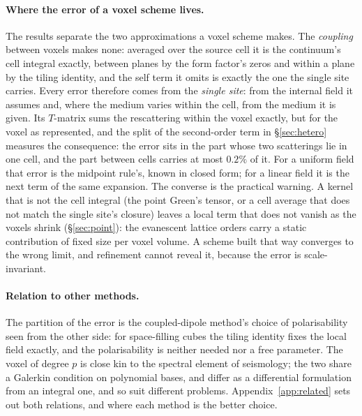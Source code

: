 \documentclass[11pt,a4paper]{article}
\begin{document}
\paragraph{Where the error of a voxel scheme lives.} The results separate the two approximations
a voxel scheme makes. The \emph{coupling} between voxels makes none: averaged over the source cell it
is the continuum's cell integral exactly, between planes by the form factor's zeros and within a
plane by the tiling identity, and the self term it omits is exactly the one the single site
carries. Every error therefore comes from the \emph{single site}: from the internal field it
assumes and, where the medium varies within the cell, from the medium it is given. Its $T$-matrix sums
the rescattering within the voxel exactly, but for the voxel as represented, and the split of the
second-order term in \S\ref{sec:hetero} measures the consequence: the error sits in the part whose two
scatterings lie in one cell, and the part between cells carries at most $0.2\%$ of it. For a uniform field that error is the midpoint rule's, known in closed form; for a linear
field it is the next term of the same expansion. The converse is the practical warning. A kernel that
is not the cell integral (the point Green's tensor, or a cell average that does not match the
single site's closure) leaves a local term that does not vanish as the voxels shrink
(\S\ref{sec:point}): the evanescent lattice orders carry a static contribution of fixed size per
voxel volume. A scheme built that way converges to the wrong limit, and refinement cannot reveal
it, because the error is scale-invariant.

\paragraph{Relation to other methods.} The partition of the error is the coupled-dipole method's
choice of polarisability seen from the other side: for space-filling cubes the tiling identity fixes
the local field exactly, and the polarisability is neither needed nor a free parameter. The voxel of
degree $p$ is close kin to the spectral element of seismology; the two share a Galerkin condition on
polynomial bases, and differ as a differential formulation from an integral one, and so suit different
problems. Appendix~\ref{app:related} sets out both relations, and where each method is the better
choice.
\end{document}
